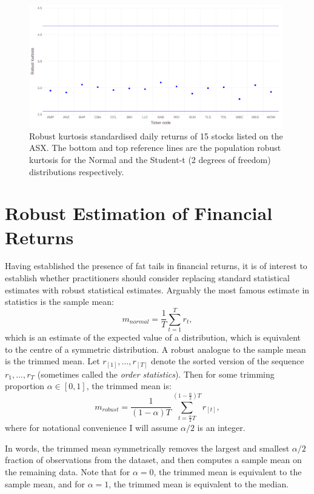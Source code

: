 \documentclass[12pt,a4paper]{amsart}
\renewcommand{\a}{\alpha}
\begin{document}
\begin{figure}[htbp]
\centering
\includegraphics[height=5.35cm]{RobustKurtStocksStd.png}
\caption{\footnotesize{Robust kurtosis standardised daily returns of 15 stocks listed on the ASX. The bottom and top reference lines are the population robust kurtosis for the Normal and the Student-t (2 degrees of freedom) distributions respectively.}}
\label{figRobustKurtStocksStd}
\end{figure}



\section{Robust Estimation of Financial Returns}\label{secFinReturnTailFatness}

Having established the presence of fat tails in financial returns, it is of interest to establish whether practitioners should consider replacing standard statistical estimates with robust statistical estimates. Arguably the most famous estimate in statistics is the sample mean:
\begin{equation}
m_{normal} = \frac{1}{T} \sum_{t=1}^T r_t ,
\end{equation}
which is an estimate of the expected value of a distribution, which is equivalent to the centre of a symmetric distribution. A robust analogue to the sample mean is the trimmed mean. Let $r_{[1]}, ..., r_{[T]}$ denote the sorted version of the sequence $r_1, ..., r_T$ (sometimes called the \emph{order statistics}). Then for some trimming proportion $\a \in [0, 1]$, the trimmed mean is:
\begin{equation}
m_{robust} = \frac{1}{(1 - \a) T} \sum_{t=\frac{\a}{2} T}^{(1 - \frac{\a}{2}) T} r_{[t]} ,
\end{equation}
where for notational convenience I will assume $\a / 2$ is an integer.

In words, the trimmed mean symmetrically removes the largest and smallest $\a / 2$ fraction of observations from the dataset, and then computes a sample mean on the remaining data. Note that for $\a = 0$, the trimmed mean is equivalent to the sample mean, and for $\a = 1$, the trimmed mean is equivalent to the median.
\end{document}
